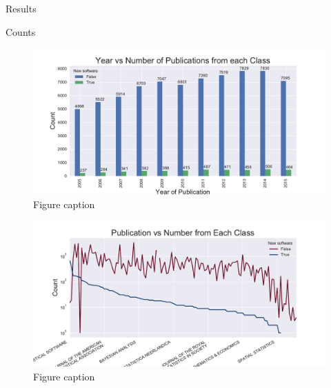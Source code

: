 \documentclass[final]{beamer}
\newlength{\sepwid}
\newlength{\onecolwid}
\begin{document}
\begin{frame}{}
\begin{columns}[t]
\begin{column}{\onecolwid}
\begin{block}{Results}
\end{block}
\begin{block}{Counts}
	\begin{figure}
		\includegraphics[width=0.8\linewidth]{countvyear.pdf}
		\caption{Figure caption}
	\end{figure}
\begin{figure}
	\includegraphics[width=0.8\linewidth]{countvpub.pdf}
	\caption{Figure caption}
\end{figure}

\end{block}
\end{column} %
\end{columns}

\end{frame}
\end{document}
